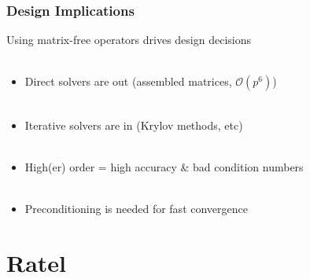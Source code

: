 \documentclass{beamer}
\begin{document}

\begin{frame}
\begin{center}
\frametitle{Design Implications}

Using matrix-free operators drives design decisions\\

~\\

\begin{itemize}

\item Direct solvers are out (assembled matrices, $\mathcal{O} \left( p^6 \right)$)\\

~\\

\item Iterative solvers are in (Krylov methods, etc)\\

~\\

\item High(er) order = high accuracy \& bad condition numbers\\

~\\

\item Preconditioning is needed for fast convergence\\

\end{itemize}

\end{center}
\end{frame}

\section{Ratel}
\end{document}
